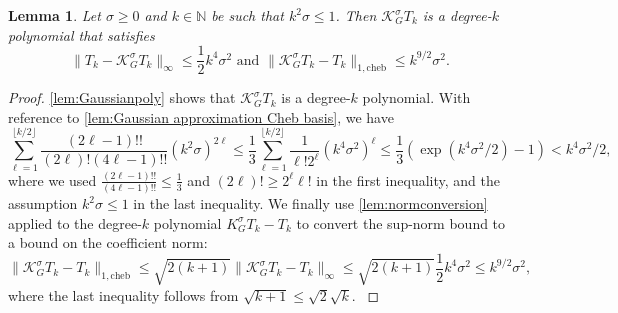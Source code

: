 \documentclass[11pt]{article}
\newcommand{\N}{\mathbb{N}}
\newtheorem{corollary}[defin]{Corollary}
\newtheorem{lemma}[defin]{Lemma}
\theoremstyle{definition}
\newcommand{\cheb}{{1,\mathrm{cheb}}}
\begin{document}

{
\begin{lemma} \label{lem:approximate identity}
       Let $\sigma \geq 0$ and $k \in \N$ be such that $k^2 \sigma \leq 1$. Then $\mathcal{K}^\sigma_G T_k$ is a degree-$k$ polynomial that satisfies
    \begin{equation*}
        \|T_k - \mathcal  K_G^\sigma T_k \|_\infty \leq \frac{1}{2}k^4 \sigma^2 \mbox{ and } \|\mathcal{K}^\sigma_G T_k - T_k\|_\cheb \leq  k^{9/2} \sigma^2.
     \end{equation*}
\end{lemma}
}
\begin{proof}[Proof]
\cref{lem:Gaussianpoly} shows that {$\mathcal K_G^\sigma T_k$} is a degree-$k$ polynomial.
{With reference to \cref{lem:Gaussian approximation Cheb basis}, we have
\[
\sum_{\ell=1}^{\lfloor k/2\rfloor} \frac{(2\ell -1)!!}{(2\ell)!(4\ell -1)!!}(k^2 \sigma)^{2\ell}
\le \frac{1}{3}\sum_{\ell=1}^{\lfloor k/2\rfloor} \frac{1}{\ell!2^\ell}(k^4 \sigma^2)^{\ell}
\le \frac{1}{3}(\exp( k^4 \sigma^2/2)-1 )  < k^4\sigma^2/2,
\]
 where we used $\frac{(2\ell -1)!!}{(4\ell -1)!!} \le \frac{1}{3}$ and $(2\ell)! \ge 2^\ell \ell!$ in the first inequality, and   the assumption $k^2 \sigma \leq 1$ in the last inequality.
  We finally use \cref{lem:normconversion} applied to the degree-$k$ polynomial $K_G^\sigma T_k -T_k$ to convert
  the sup-norm bound to a bound on the coefficient norm:
   $$\|\mathcal K_G^\sigma T_k -T_k\|_\cheb \leq \sqrt{2(k+1)} \|\mathcal K_G^\sigma T_k-T_k\|_\infty \leq \sqrt{2(k+1)} \frac{1}{2}k^4 \sigma^2 \le k^{9/2}\sigma^2,$$
   where the last inequality follows from $\sqrt{k+1} \le \sqrt{2}\sqrt{k}$.
}
\end{proof}
\end{document}

